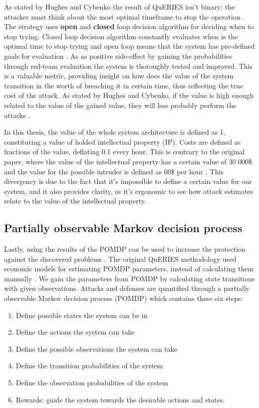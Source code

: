 As stated by Hughes and Cybenko the result of QuERIES isn't binary:
the attacker must think about the most optimal timeframe to stop the
operation \cite{hughes2013quantitative}. The strategy uses
\textbf{open} and \textbf{closed} loop decision algorithm for deciding
when to stop trying. Closed loop decision algorithm constantly
evaluates when is the optimal time to stop trying and open loop means
that the system has pre-defined goals for evaluation
\cite{carin2008cybersecurity}. As as positive side-effect by gaining
the probabilities through red-team evaluation the system is
thoroughly tested and improved. This is a valuable metric, providing
insight on how does the value of the system transition in the worth of
breaching it in certain time, thus reflecting the true cost of the
attack. As stated by Hughes and Cybenko, if the value is high enough
related to the value of the gained value, they will less probably
perform the attacks \cite{hughes2013quantitative}.

In this thesis, the value of the whole system architecture is
defined as 1, constituting a value of holded intellectual
property (IP). Costs are defined as fractions of the value, deflating 
0.1 every hour. This is contrary to the original paper, where the
value of the intellectual property has a certain value of 30 000\$ and
the value for the possible intruder is defined as 60\$ per hour
\cite{carin2008cybersecurity}. This divergency is due to the fact
that it's impossible to define a certain value for our system,
and it also provides clarity, as it's ergonomic to see how attack
estimates relate to the value of the intellectual property. 

\subsection{Partially observable Markov decision process}

Lastly, using the results of the POMDP can be used to increase the
protection against the discovered problems
\cite{carin2008cybersecurity}. The original QuERIES methodology used
economic models for estimating POMDP parameters, instead of
calculating them manually \cite{carin2008cybersecurity}. We gain the
parameters from POMDP by calculating state transitions with given
observations. Attacks and defenses are quantified through a partially
observable Markov decision process (POMDP) which contains these six
steps:

\begin{enumerate}
    \item Define possible states the system can be in
    \item Define the actions the system can take
    \item Define the possible observations the system can take
    \item Define the transition probabilities of the system
    \item Define the observation probabilities of the system
    \item Rewards: guide the system towards the desirable actions and
      states.
\end{enumerate} \cite{hughes2013quantitative}

